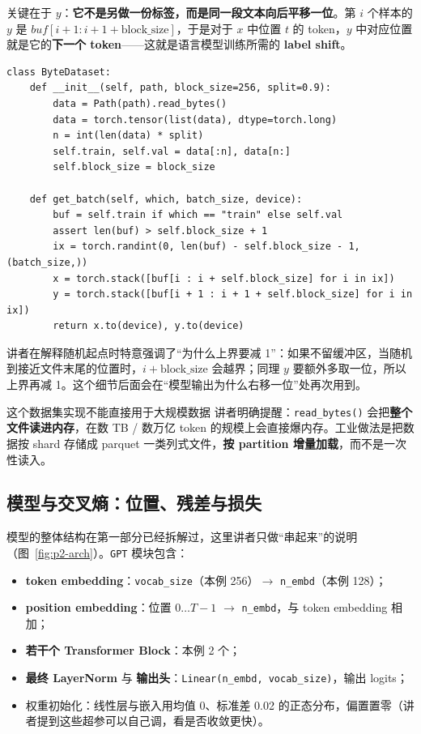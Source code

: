 关键在于 $y$：\textbf{它不是另做一份标签，而是同一段文本向后平移一位}。第 $i$ 个样本的 $y$ 是 $buf[i+1 : i+1+\text{block\_size}]$，于是对于 $x$ 中位置 $t$ 的 token，$y$ 中对应位置就是它的\textbf{下一个 token}——这就是语言模型训练所需的 \textbf{label shift}。

\begin{lstlisting}[caption={批采样与 label shift（据视频 \texttt{dataset.py} 整理）：$y$ 是 $x$ 右移一位的同一段文本。}]
class ByteDataset:
    def __init__(self, path, block_size=256, split=0.9):
        data = Path(path).read_bytes()
        data = torch.tensor(list(data), dtype=torch.long)
        n = int(len(data) * split)
        self.train, self.val = data[:n], data[n:]
        self.block_size = block_size

    def get_batch(self, which, batch_size, device):
        buf = self.train if which == "train" else self.val
        assert len(buf) > self.block_size + 1
        ix = torch.randint(0, len(buf) - self.block_size - 1, (batch_size,))
        x = torch.stack([buf[i : i + self.block_size] for i in ix])
        y = torch.stack([buf[i + 1 : i + 1 + self.block_size] for i in ix])
        return x.to(device), y.to(device)
\end{lstlisting}

讲者在解释随机起点时特意强调了“为什么上界要减 1”：如果不留缓冲区，当随机到接近文件末尾的位置时，$i+\text{block\_size}$ 会越界；同理 $y$ 要额外多取一位，所以上界再减 1。这个细节后面会在“模型输出为什么右移一位”处再次用到。

\begin{warningbox}{这个数据集实现不能直接用于大规模数据}
讲者明确提醒：\texttt{read\_bytes()} 会把\textbf{整个文件读进内存}，在数 TB / 数万亿 token 的规模上会直接爆内存。工业做法是把数据按 shard 存储成 parquet 一类列式文件，\textbf{按 partition 增量加载}，而不是一次性读入。
\end{warningbox}

\subsection{模型与交叉熵：位置、残差与损失}

模型的整体结构在第一部分已经拆解过，这里讲者只做“串起来”的说明（图~\ref{fig:p2-arch}）。\texttt{GPT} 模块包含：

\begin{itemize}
\item \textbf{token embedding}：\texttt{vocab\_size}（本例 256）$\rightarrow$ \texttt{n\_embd}（本例 128）；
\item \textbf{position embedding}：位置 $0\ldots T-1$ $\rightarrow$ \texttt{n\_embd}，与 token embedding 相加；
\item \textbf{若干个 Transformer Block}：本例 2 个；
\item \textbf{最终 LayerNorm} 与 \textbf{输出头}：\texttt{Linear(n\_embd, vocab\_size)}，输出 logits；
\item 权重初始化：线性层与嵌入用均值 0、标准差 0.02 的正态分布，偏置置零（讲者提到这些超参可以自己调，看是否收敛更快）。
\end{itemize}

